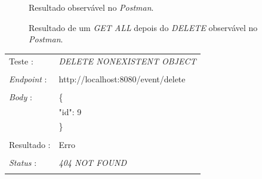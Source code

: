 \begin{figure}[h]
	\begin{center}
	\end{center}
	\caption{Resultado observável no \emph{Postman}.}\label{fig:eventdelete}
\end{figure}
\newpage
\begin{figure}[h]
	\begin{center}
	\end{center}
	\caption{Resultado de um \emph{GET ALL} depois do \emph{DELETE} observável no \emph{Postman}.}\label{fig:eventallafterdelete}
\end{figure}
\newpage
\begin{tabular}{ll}
	Teste : & \emph{DELETE NONEXISTENT OBJECT}\\
	\\
	\emph{Endpoint} : & http://localhost:8080/event/delete\\
	\\
	\emph{Body} : & \{ \\
	& "id": 9 \\
	& \} \\
	\\
	Resultado : & Erro\\
	\\
	\emph{Status} : & \emph{404 NOT FOUND}\\
	\\
\end{tabular}


